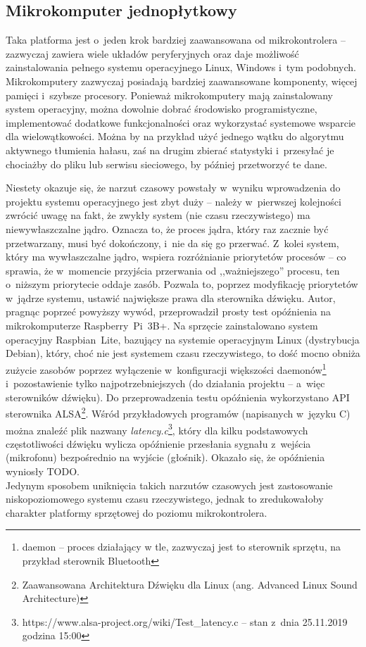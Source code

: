 \subsection{Mikrokomputer jednopłytkowy}
\label{mikrokomp}
Taka platforma jest o~jeden krok bardziej zaawansowana od mikrokontrolera -- zazwyczaj zawiera wiele układów peryferyjnych oraz daje możliwość zainstalowania pełnego systemu operacyjnego Linux, Windows i~tym podobnych. Mikrokomputery zazwyczaj posiadają bardziej zaawansowane komponenty, więcej pamięci i~szybsze procesory. Ponieważ mikrokomputery mają zainstalowany system operacyjny, można dowolnie dobrać środowisko programistyczne, implementować dodatkowe funkcjonalności oraz wykorzystać systemowe wsparcie dla wielowątkowości. Można by na przykład użyć jednego wątku do algorytmu aktywnego tłumienia hałasu, zaś na drugim zbierać statystyki i~przesyłać je chociażby do pliku lub serwisu sieciowego, by później przetworzyć te dane.

Niestety okazuje się, że narzut czasowy powstały w~wyniku wprowadzenia do projektu systemu operacyjnego jest zbyt duży -- należy w~pierwszej kolejności zwrócić uwagę na fakt, że zwykły system (nie czasu rzeczywistego) ma niewywłaszczalne jądro. Oznacza to, że proces jądra, który raz zacznie być przetwarzany, musi być dokończony, i~nie da się go przerwać. Z~kolei system, który ma wywłaszczalne jądro, wspiera rozróżnianie priorytetów procesów -- co sprawia, że w~momencie przyjścia przerwania od ,,ważniejszego'' procesu, ten o~niższym priorytecie oddaje zasób. Pozwala to, poprzez modyfikację priorytetów w~jądrze systemu, ustawić największe prawa dla sterownika dźwięku.
Autor, pragnąc poprzeć powyższy wywód, przeprowadził prosty test opóźnienia na mikrokomputerze Raspberry~Pi~3B+. Na sprzęcie zainstalowano system operacyjny Raspbian~Lite, bazujący na systemie operacyjnym Linux (dystrybucja Debian), który, choć nie jest systemem czasu rzeczywistego, to dość mocno obniża zużycie zasobów poprzez wyłączenie w~konfiguracji większości daemonów\footnote{daemon -- proces działający w tle, zazwyczaj jest to sterownik sprzętu, na przykład sterownik Bluetooth} i~pozostawienie tylko najpotrzebniejszych (do działania projektu -- a~więc sterowników dźwięku). Do przeprowadzenia testu opóźnienia wykorzystano API sterownika ALSA\footnote{Zaawansowana Architektura Dźwięku dla Linux (ang. Advanced Linux Sound Architecture)}. Wśród przykładowych programów (napisanych w~języku C) można znaleźć plik nazwany \textit{latency.c}\footnote{https://www.alsa-project.org/wiki/Test\_latency.c -- stan z~dnia 25.11.2019 godzina 15:00}, który dla kilku podstawowych częstotliwości dźwięku wylicza opóźnienie przesłania sygnału z~wejścia (mikrofonu) bezpośrednio na wyjście (głośnik). Okazało się, że opóźnienia wyniosły TODO. %
\\
Jedynym sposobem uniknięcia takich narzutów czasowych jest zastosowanie niskopoziomowego systemu czasu rzeczywistego, jednak to zredukowałoby charakter platformy sprzętowej do poziomu mikrokontrolera.
